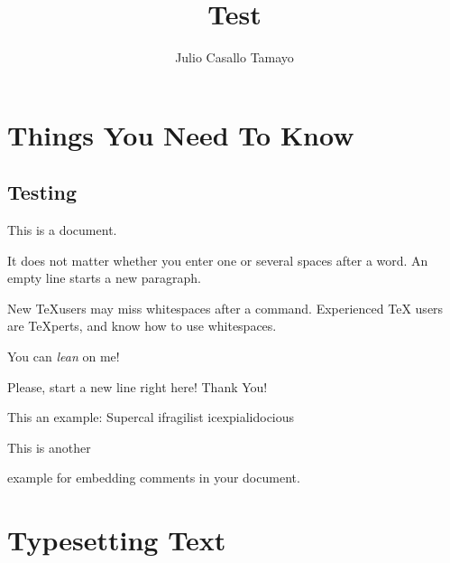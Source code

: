\documentclass[a4paper,11pt]{report}
\title{Test}
\author{Julio Casallo Tamayo}
\begin{document}
  \maketitle

  \tableofcontents

  \chapter{Things You Need To Know}

  \section{Testing}
  This is a document.

  It does not matter whether you enter one or   several    
  spaces after a word.
  An empty line starts a new paragraph.

  New \TeX users may miss whitespaces after a command.
  Experienced \TeX{} users are \TeX perts, and know how to
  use whitespaces. %

  You can \textsl{lean} on me!

  Please, start a new line right here! \newline 
  Thank You!

  This an %
  example: Supercal%
              ifragilist%
        icexpialidocious

  This is another \begin{comment}
    rather stupid, 
    but helpful
  \end{comment}
  example for embedding comments in your document.

  

  \chapter{Typesetting Text}
\end{document}
